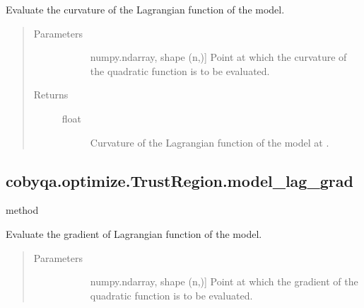 \documentclass[letterpaper,10pt,english]{sphinxmanual}
\begin{document}
\begin{fulllineitems}
\begin{fulllineitems}
\label{\detokenize{refs/generated/cobyqa.optimize.TrustRegion.model_lag_curv:cobyqa.optimize.TrustRegion.model_lag_curv}}
\sphinxAtStartPar
Evaluate the curvature of the Lagrangian function of the model.
\begin{quote}\begin{description}
\item[{Parameters}] \leavevmode\begin{description}
\item[{}] \leavevmode{[}numpy.ndarray, shape (n,){]}
\sphinxAtStartPar
Point at which the curvature of the quadratic function is to be
evaluated.

\end{description}

\item[{Returns}] \leavevmode\begin{description}
\item[{float}] \leavevmode
\sphinxAtStartPar
Curvature of the Lagrangian function of the model at .

\end{description}

\end{description}\end{quote}

\end{fulllineitems}



\subsection{cobyqa.optimize.TrustRegion.model\_lag\_grad}
\label{\detokenize{refs/generated/cobyqa.optimize.TrustRegion.model_lag_grad:cobyqa-optimize-trustregion-model-lag-grad}}\label{\detokenize{refs/generated/cobyqa.optimize.TrustRegion.model_lag_grad::doc}}
\sphinxAtStartPar
method

\begin{fulllineitems}
\label{\detokenize{refs/generated/cobyqa.optimize.TrustRegion.model_lag_grad:cobyqa.optimize.TrustRegion.model_lag_grad}}
\sphinxAtStartPar
Evaluate the gradient of Lagrangian function of the model.
\begin{quote}\begin{description}
\item[{Parameters}] \leavevmode\begin{description}
\item[{}] \leavevmode{[}numpy.ndarray, shape (n,){]}
\sphinxAtStartPar
Point at which the gradient of the quadratic function is to be
evaluated.


\end{description}
\end{description}
\end{quote}
\end{fulllineitems}
\end{fulllineitems}
\end{document}

